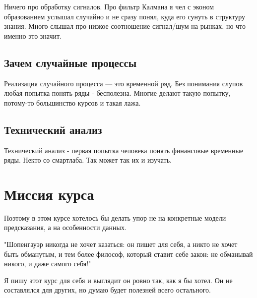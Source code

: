 Ничего про обработку сигналов. Про фильтр Калмана я чел с эконом образованием услышал случайно и не сразу понял, куда его сунуть в структуру знания.
Много слышал про низкое соотношение сигнал/шум на рынках, но что именно это значит.


\subsection{Зачем случайные процессы}
Реализация случайного процесса — это временной ряд. Без понимания слупов любая попытка понять ряды - бесполезна. Многие делают такую попытку, потому-то большинство курсов и такая лажа.

\subsection{Технический анализ}

Технический анализ - первая попытка человека понять финансовые временные ряды. Некто со смартлаба.
Так может так их и изучать.

\section{Миссия курса}

Поэтому в этом курсе хотелось бы делать упор не на конкретные модели предсказания, а на особенности данных.

"Шопенгауэр никогда не хочет казаться: он пишет для себя, а никто не хочет быть обманутым, и тем более философ, который ставит себе закон: не обманывай никого, и даже самого себя!"

Я пишу этот курс для себя и выглядит он ровно так, как я бы хотел. Он не составлялся для других, но думаю будет полезней всего остального.